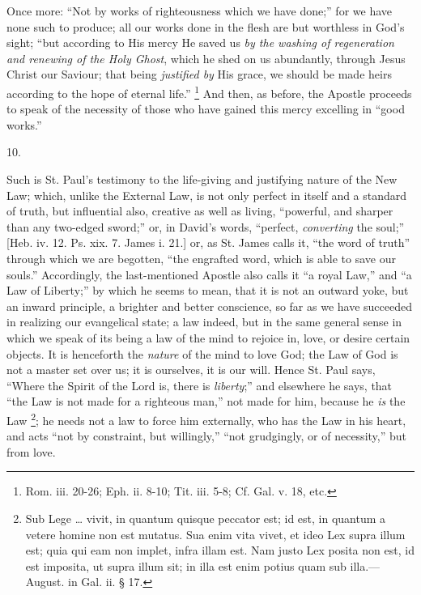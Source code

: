 Once more: ``Not by works of righteousness which we have
done;'' for we have none such to produce; all our works done in
the flesh are but worthless in God's sight; ``but according to His
mercy He saved us \emph{by the washing of regeneration and renewing of
the Holy Ghost}, which he shed on us abundantly, through Jesus
Christ our Saviour; that being \emph{justified by} His grace, we
should be made heirs according to the hope of eternal life.'' \footnote{Rom. iii.
20-26; Eph. ii. 8-10; Tit. iii. 5-8; Cf. Gal. v. 18, etc.} And then, as before, the Apostle proceeds to speak of the
necessity of those who have gained this mercy excelling in ``good
works.''

10.

Such is St. Paul's testimony to the life-giving and justifying
nature of the New Law; which, unlike the External Law, is not only
perfect in itself and a standard of truth, but influential also,
creative as well as living, ``powerful, and sharper than any
two-edged sword;'' or, in David's words, ``perfect, \emph{converting}
the soul;'' [Heb. iv. 12. Ps. xix. 7. James i. 21.] or, as St.
James calls it, ``the word of truth'' through which we are
begotten, ``the engrafted word, which is able to save our
souls.'' Accordingly, the last-mentioned Apostle also calls it
``a royal Law,'' and ``a Law of Liberty;'' by which he
seems to mean, that it is not an outward yoke, but an inward
principle, a brighter and better conscience, so far as we have
succeeded in realizing our evangelical state; a law indeed, but in the
same general sense in which we speak of its being a law of the mind to
rejoice in, love, or desire certain objects. It is henceforth the \emph{nature}
of the mind to love God; the Law of God is not a master set over us;
it is ourselves, it is our will. Hence St. Paul says, ``Where the
Spirit of the Lord is, there is \emph{liberty};'' and elsewhere he
says, that ``the Law is not made for a righteous man,'' not
made for him, because he \emph{is} the Law \footnote{Sub Lege …
vivit, in quantum quisque peccator est; id est, in quantum a vetere
homine non est mutatus. Sua enim vita vivet, et ideo Lex supra illum
est; quia qui eam non implet, infra illam est. Nam justo Lex posita
non est, id est imposita, ut supra illum sit; in illa est enim potius
quam sub illa.—August. in Gal. ii. § 17.}; he needs not a law to force him externally, who has the
Law in his heart, and acts ``not by constraint, but
willingly,'' ``not grudgingly, or of necessity,'' but from
love.

